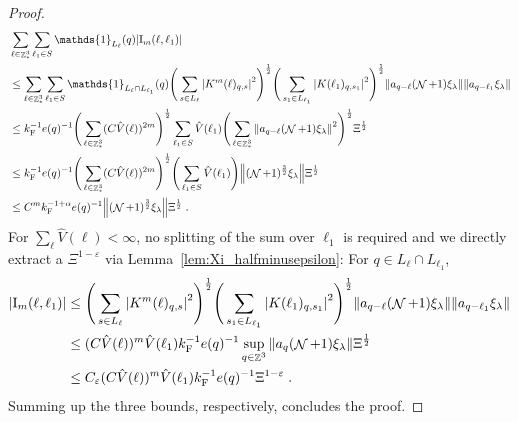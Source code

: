 \documentclass[12pt,a4paper]{article}
\numberwithin{equation}{section}
\newcommand{\1}{\mathbb{I}}
\newcommand{\F}{\mathrm{F}}
\newcommand{\I}{\mathrm{I}}
\DeclareMathOperator{\Z}{\mathbb{Z}}
\DeclareMathOperator{\NN}{\mathcal{N}}
\newcommand{\half}{\frac{1}{2}}
\theoremstyle{plain}
\theoremstyle{definition}
\theoremstyle{remark}
\theoremstyle{plain}
\theoremstyle{definition}
\theoremstyle{remark}
\begin{document}
\begin{proof}
{\begin{align}
	&\sum_{\ell \in \Z^3_*} \sum_{\ell_1 \in S} \mathds{1}_{L_\ell}(q) |\I_m(\ell, \ell_1)| \nonumber\\
	&\leq \sum_{\ell \in \Z^3_*} \sum_{\ell_1 \in S} \mathds{1}_{L_\ell \cap L_{\ell_1}}(q) \Bigg(\sum\limits_{s \in L_{\ell}} \abs{K^m(\ell)_{q,s}}^2\Bigg)^\half
		\Bigg(\sum\limits_{s_1 \in L_{\ell_1}} \abs{K(\ell_1)_{q,s_1}}^2\Bigg)^\half
		\norm{ a_{q-\ell} (\NN+1) \xi_\lambda}
		\norm{ a_{q-\ell_1} \xi_\lambda }\nonumber\\
	&\leq k_{\F}^{-1} e(q)^{-1}
		\Bigg( \sum_{\ell \in \Z^3_*} (C \hat{V}(\ell))^{2m} \Bigg)^{\half}
		\sum_{\ell_1 \in S} \hat{V}(\ell_1)
		\Bigg( \sum_{\ell \in \Z^3_*} \norm{ a_{q-\ell} (\NN+1) \xi_\lambda}^2 \Bigg)^{\half}
		\Xi^{\half} \nonumber\\
	&\leq k_{\F}^{-1} e(q)^{-1}
		\Bigg( \sum_{\ell \in \Z^3_*} (C \hat{V}(\ell))^{2m} \Bigg)^{\half}
		\Bigg( \sum_{\ell_1 \in S} \hat{V}(\ell_1) \Bigg) \norm{(\NN+1)^{\frac 32} \xi_\lambda} \Xi^{\half} \nonumber\\
	&\leq C^m k_{\F}^{-1 + \alpha} e(q)^{-1}
		\norm{(\NN+1)^{\frac 32} \xi_\lambda} \Xi^{\half} \;. \label{eq:estEQ2113_Coulomb_2}
\end{align}
}
For $ \sum_\ell \hat{V}(\ell) < \infty $, no splitting of the sum over $ \ell_1 $ is required and we directly extract a $ \Xi^{1-\varepsilon} $ via Lemma~\ref{lem:Xi_halfminusepsilon}: For $ q \in L_\ell \cap L_{\ell_1} $,
\begin{align}
	|\I_m(\ell, \ell_1)|
	&\leq \Bigg(\sum\limits_{s \in L_{\ell}} \abs{K^m(\ell)_{q,s}}^2\Bigg)^\half
		\Bigg(\sum\limits_{s_1 \in L_{\ell_1}} \abs{K(\ell_1)_{q,s_1}}^2\Bigg)^\half
		\norm{ a_{q-\ell} (\NN+1) \xi_\lambda}
		\norm{ a_{q-\ell_1} \xi_\lambda }\nonumber\\
	&\leq (C \hat{V}(\ell))^m \hat{V}(\ell_1) k_{\F}^{-1} e(q)^{-1}
		\sup_{q \in \Z^3} \norm{ a_q (\NN+1) \xi_\lambda }\Xi^{\half} \nonumber\\
	&\leq C_\varepsilon (C \hat{V}(\ell))^m
		\hat{V}(\ell_1)
		k_{\F}^{-1} e(q)^{-1} \Xi^{1-\varepsilon} \;. \label{eq:estEQ2113}
\end{align}
Summing up the three bounds, respectively, concludes the proof.
\end{proof}
\end{document}
